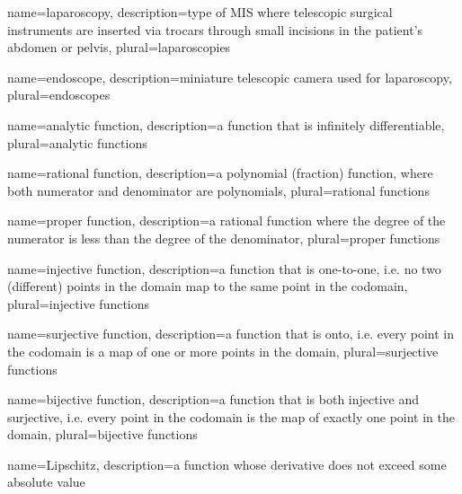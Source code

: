 


{name=laparoscopy,
 description={type of MIS where telescopic surgical instruments are inserted via trocars through small incisions in the patient's abdomen or pelvis},
 plural={laparoscopies}
}

{name=endoscope,
 description={miniature telescopic camera used for \gls{laparoscopy}},
 plural={endoscopes}
}

{name={analytic function},
 description={a function that is infinitely differentiable},
 plural={analytic functions}
}

{name={rational function},
 description={a polynomial (fraction) function, where both numerator and denominator are polynomials},
 plural={rational functions}
}

{name={proper function},
 description={a rational function where the degree of the numerator is less than the degree of the denominator},
 plural={proper functions}
}

{name={injective function},
 description={a function that is one-to-one, i.e. no two (different) points in the domain map to the same point in the codomain},
 plural={injective functions}
}

{name={surjective function},
 description={a function that is onto, i.e. every point in the codomain is a map of one or more points in the domain},
 plural={surjective functions}
}

{name={bijective function},
 description={a function that is both injective and surjective, i.e. every point in the codomain is the map of exactly one point in the domain},
 plural={bijective functions}
}

{name={Lipschitz},
 description={a function whose derivative does not exceed some absolute value}
}

